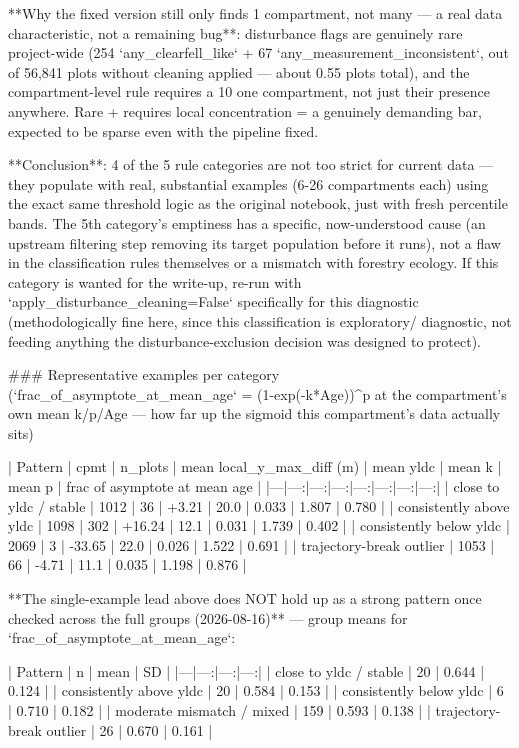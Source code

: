 **Why the fixed version still only finds 1 compartment, not many — a real data characteristic, not
a remaining bug**: disturbance flags are genuinely rare project-wide (254 `any_clearfell_like` +
67 `any_measurement_inconsistent`, out of 56,841 plots without cleaning applied — about 0.55%
plots total), and the compartment-level rule requires a 10%
one compartment, not just their presence anywhere. Rare + requires local concentration = a
genuinely demanding bar, expected to be sparse even with the pipeline fixed.

**Conclusion**: 4 of the 5 rule categories are not too strict for current data — they populate with
real, substantial examples (6-26 compartments each) using the exact same threshold logic as the
original notebook, just with fresh percentile bands. The 5th category's emptiness has a specific,
now-understood cause (an upstream filtering step removing its target population before it runs),
not a flaw in the classification rules themselves or a mismatch with forestry ecology. If this
category is wanted for the write-up, re-run with `apply_disturbance_cleaning=False` specifically
for this diagnostic (methodologically fine here, since this classification is exploratory/
diagnostic, not feeding anything the disturbance-exclusion decision was designed to protect).

### Representative examples per category (`frac_of_asymptote_at_mean_age` = (1-exp(-k*Age))^p at
the compartment's own mean k/p/Age — how far up the sigmoid this compartment's data actually sits)

| Pattern | cpmt | n_plots | mean local_y_max_diff (m) | mean yldc | mean k | mean p | frac of asymptote at mean age |
|---|---:|---:|---:|---:|---:|---:|---:|
| close to yldc / stable | 1012 | 36 | +3.21 | 20.0 | 0.033 | 1.807 | 0.780 |
| consistently above yldc | 1098 | 302 | +16.24 | 12.1 | 0.031 | 1.739 | 0.402 |
| consistently below yldc | 2069 | 3 | -33.65 | 22.0 | 0.026 | 1.522 | 0.691 |
| trajectory-break outlier | 1053 | 66 | -4.71 | 11.1 | 0.035 | 1.198 | 0.876 |

**The single-example lead above does NOT hold up as a strong pattern once checked across the full
groups (2026-08-16)** — group means for `frac_of_asymptote_at_mean_age`:

| Pattern | n | mean | SD |
|---|---:|---:|---:|
| close to yldc / stable | 20 | 0.644 | 0.124 |
| consistently above yldc | 20 | 0.584 | 0.153 |
| consistently below yldc | 6 | 0.710 | 0.182 |
| moderate mismatch / mixed | 159 | 0.593 | 0.138 |
| trajectory-break outlier | 26 | 0.670 | 0.161 |

